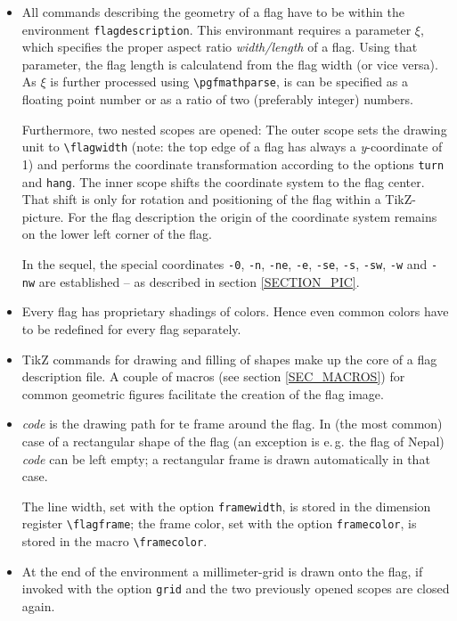 \documentclass[11pt,a4paper,headsepline,fleqn]{scrreprt}
\def\tb{\textbackslash}
\let\ti=\textit
\let\tt=\texttt
\def\command#1{{\color{emphcolor}\texttt{#1}}}
\begin{document}
\begin{itemize}
\item[\ding{192}]
All commands describing the geometry of a flag have to be within
the environment \command{flagdescription}.
This environmant requires a parameter
\emph{\color{emphcolor}$\xi$}, which specifies the proper aspect ratio
\emph{width/length} of a flag.
Using that parameter, the flag length is calculatend from the flag width
(or vice versa).
As \command{$\xi$} is further processed using \tt{\tb pgfmathparse},
is can be specified as a floating point number or as a ratio of two
(preferably integer) numbers.

Furthermore, two nested scopes are opened:
The outer scope sets the drawing unit to \command{\tb flagwidth}
(note: the top edge of a flag has always a \ti{y}-coordinate of 1)
and performs the coordinate transformation according to the options
\command{turn} and \command{hang}.
The inner scope shifts the coordinate system to the flag center.
That shift is only for rotation and positioning of the flag within a
TikZ-picture.
For the flag description the origin of the coordinate system remains on the
lower left corner of the flag.

In the sequel, the special coordinates
\command{-0}, \command{-n}, \command{-ne}, \command{-e}, \command{-se},
\command{-s}, \command{-sw}, \command{-w} and \command{-nw}
are established -- as described in section \ref{SECTION_PIC}.

\item[\ding{193}]
Every flag has proprietary shadings of colors.
Hence even common colors have to be redefined for every flag separately.

\item[\ding{194}]
TikZ commands for drawing and filling of shapes make up the core of
a flag description file.
A couple of macros (see section \ref{SEC_MACROS})
for common geometric figures facilitate the creation of the flag image.

\item[\ding{195}]
\emph{\color{emphcolor}code} is the drawing path for te frame around the flag.
In (the most common) case of a rectangular shape of the flag
(an exception is e.\,g. the flag of Nepal) \ti{code} can be left empty;
a rectangular frame is drawn automatically in that case.

The line width, set with the option \command{framewidth}, is stored in the
dimension register \command{\tb flagframe};
the frame color, set with the option \command{framecolor}, is stored in the
macro \command{\tb framecolor}.

\item[\ding{196}]
At the end of the environment a millimeter-grid is drawn onto the flag, if invoked with the option
\command{grid} and the two previously opened scopes are closed again.
\end{itemize}
\end{document}
